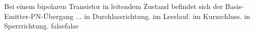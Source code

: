     {Bei einem bipolaren Transistor in leitendem Zustand befindet sich der Basis-Emitter-PN-Übergang ...}
    {in Durchlassrichtung.}
    {im Leerlauf.}
    {im Kurzschluss.}
    {in Sperrrichtung.}
    {false}{false}